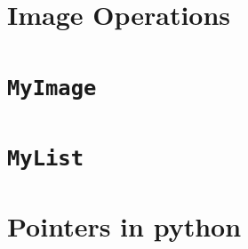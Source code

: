 \documentclass[addpoints]{exam}
\begin{document}
\newpage
\appendix
\section{Image Operations}


\newpage
\section{\texttt{MyImage}}


\newpage
\section{\texttt{MyList}}


\newpage
\section{Pointers in python}




\end{document}
